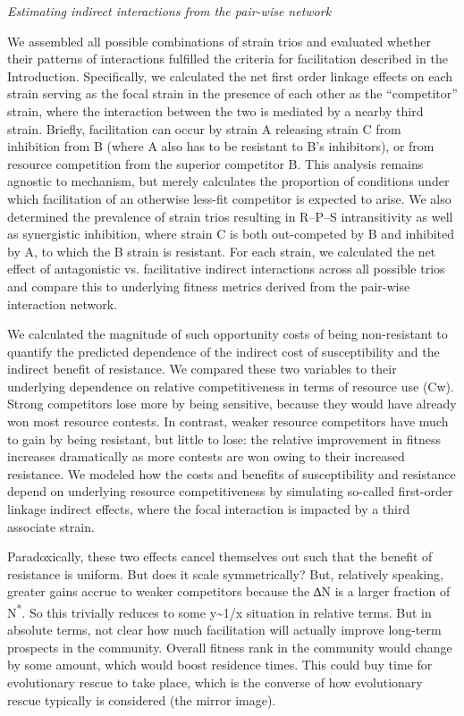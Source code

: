 \emph{Estimating indirect interactions from the pair-wise network}

We assembled all possible combinations of strain trios and evaluated
whether their patterns of interactions fulfilled the criteria for
facilitation described in the Introduction. Specifically, we calculated
the net first order linkage effects on each strain serving as the focal
strain in the presence of each other as the ``competitor'' strain, where
the interaction between the two is mediated by a nearby third strain.
Briefly, facilitation can occur by strain A releasing strain C from
inhibition from B (where A also has to be resistant to B's inhibitors),
or from resource competition from the superior competitor B. This
analysis remains agnostic to mechanism, but merely calculates the
proportion of conditions under which facilitation of an otherwise
less-fit competitor is expected to arise. We also determined the
prevalence of strain trios resulting in R--P--S intransitivity as well
as synergistic inhibition, where strain C is both out-competed by B and
inhibited by A, to which the B strain is resistant. For each strain, we
calculated the net effect of antagonistic vs. facilitative indirect
interactions across all possible trios and compare this to underlying
fitness metrics derived from the pair-wise interaction network.

We calculated the magnitude of such opportunity costs of being
non-resistant to quantify the predicted dependence of the indirect cost
of susceptibility and the indirect benefit of resistance. We compared
these two variables to their underlying dependence on relative
competitiveness in terms of resource use (Cw). Strong competitors lose
more by being sensitive, because they would have already won most
resource contests. In contrast, weaker resource competitors have much to
gain by being resistant, but little to lose: the relative improvement in
fitness increases dramatically as more contests are won owing to their
increased resistance. We modeled how the costs and benefits of
susceptibility and resistance depend on underlying resource
competitiveness by simulating so-called first-order linkage indirect
effects, where the focal interaction is impacted by a third associate
strain.

Paradoxically, these two effects cancel themselves out such that the
benefit of resistance is uniform. But does it scale symmetrically? But,
relatively speaking, greater gains accrue to weaker competitors because
the ∆N is a larger fraction of N\textsuperscript{*}. So this trivially
reduces to some y\textasciitilde{}1/x situation in relative terms. But
in absolute terms, not clear how much facilitation will actually improve
long-term prospects in the community. Overall fitness rank in the
community would change by some amount, which would boost residence
times. This could buy time for evolutionary rescue to take place, which
is the converse of how evolutionary rescue typically is considered (the
mirror image).
